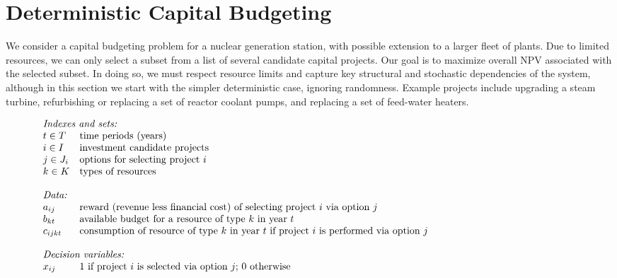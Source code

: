 \section{Deterministic Capital Budgeting}
\label{sec:DeterministicCapitalBudgeting}

We consider a capital budgeting problem for a nuclear generation station, with possible extension to
a larger fleet of plants. 
Due to limited resources, we can only select a subset from a list of
several candidate capital projects. 
Our goal is to maximize overall NPV associated with the
selected subset. 
In doing so, we must respect resource limits and capture key structural and
stochastic dependencies of the system, although in this section we start with the simpler
deterministic case, ignoring randomness.  
Example projects include upgrading a steam turbine,
refurbishing or replacing a set of reactor coolant pumps, and replacing a set of feed-water heaters.

\[
\begin{array}{ll}
\multicolumn{2}{l}{\mbox{\em Indexes and sets:} } \\
t \in T  & \mbox{time periods (years)} \\
i \in I  & \mbox{investment candidate projects} \\
j \in J_{i}	& \mbox{options for selecting project $i$} \\%
k \in K	& \mbox{types of resources} \\%
\\
\multicolumn{2}{l}{\mbox{\em Data:}} \\
a_{ij} & \mbox{reward (revenue less financial cost) of selecting project $i$ via option $j$}  \\
b_{kt} & \mbox{available budget for a resource of type $k$ in year $t$}\\
c_{ijkt}  & \mbox{consumption of resource of type $k$ in year $t$ if project $i$ is performed via option $j$} \\
\\
\multicolumn{2}{l}{\mbox{\em Decision variables:}}  \\
x_{ij} & \mbox{1 if project $i$ is selected via option $j$; 0 otherwise} \hspace*{4.0in}\\
\end{array}
\]

